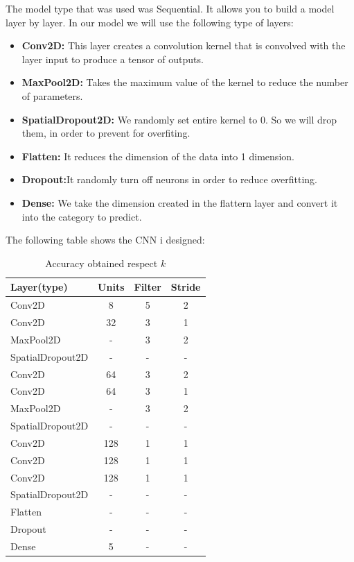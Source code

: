 \documentclass{article}
\begin{document}
The model type that was used was Sequential. It allows you to build a model layer by layer. In our model we will use the following type of layers:

\begin{itemize}
    \item \textbf{Conv2D:} This layer creates a convolution kernel that is convolved with the layer input to produce a tensor of outputs.
    \item \textbf{MaxPool2D:} Takes the maximum value of the kernel to reduce the number of parameters.
    \item \textbf{SpatialDropout2D:} We randomly set entire kernel to 0. So we will drop them, in order to prevent for overfiting.
    \item \textbf{Flatten:} It reduces the dimension of the data into 1 dimension.
    \item \textbf{Dropout:}It randomly turn off neurons in order to reduce overfitting.
    \item \textbf{Dense:} We take the dimension created in the flattern layer and convert it into the category to predict.
    
\end{itemize}
 
The following table shows the CNN i designed:

\begin{table}[ht]
    \centering
    \begin{tabular}{|l|ccc|}
        \hline
        \textbf{Layer(type)} & \textbf{Units} & \textbf{Filter} & \textbf{Stride} \\
        \hline
        Conv2D & 8 & 5 & 2 \\ \hline
        Conv2D & 32 & 3 & 1\\ \hline
        MaxPool2D & - & 3 & 2\\ \hline
        SpatialDropout2D & - & - & -\\ \hline

        Conv2D & 64 & 3 & 2\\ \hline
        Conv2D & 64 & 3 & 1\\ \hline
        MaxPool2D & - & 3 & 2\\ \hline
        SpatialDropout2D & - & - & -\\ \hline

        Conv2D & 128 & 1 & 1\\ \hline
        Conv2D & 128 & 1 & 1\\ \hline
        Conv2D & 128 & 1 & 1\\ \hline
        SpatialDropout2D & - & - & -\\ \hline

        Flatten & - & - & -\\ \hline
        Dropout & - & - & -\\ \hline
        Dense & 5 & - & -\\ \hline

    \end{tabular}
    \caption{Accuracy obtained respect $k$}
    \label{tab:knn_results}
\end{table}
\end{document}
